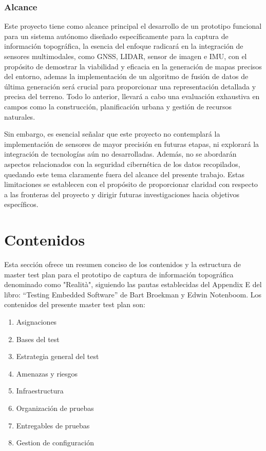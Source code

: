 \documentclass[12pt,a4paper, twoside]{article} %
\begin{document}
\subsubsection{Alcance}
\label{subsec:org12e44a2}


Este proyecto tiene como alcance principal el desarrollo de un prototipo funcional para un sistema autónomo diseñado específicamente para la captura de información topográfica, la esencia del enfoque radicará en la integración de sensores multimodales, como GNSS, LIDAR, sensor de imagen e IMU, con el propósito de demostrar la viabilidad y eficacia en la generación de mapas precisos del entorno, ademas la implementación de un algoritmo de fusión de datos de última generación será crucial para proporcionar una representación detallada y precisa del terreno. Todo lo anterior, llevará a cabo una evaluación exhaustiva en campos como la construcción, planificación urbana y gestión de recursos naturales.




Sin embargo, es esencial señalar que este proyecto no contemplará la implementación de sensores de mayor precisión en futuras etapas, ni explorará la integración de tecnologías aún no desarrolladas. Además, no se abordarán aspectos relacionados con la seguridad cibernética de los datos recopilados, quedando este tema claramente fuera del alcance del presente trabajo. Estas limitaciones se establecen con el propósito de proporcionar claridad con respecto a las fronteras del proyecto y dirigir futuras investigaciones hacia objetivos específicos.


\section{Contenidos}
\label{sec:orgc1c4017}

Esta sección ofrece un resumen conciso de los contenidos y la estructura  de master test plan para el prototipo de captura de información topográfica denominado como "Realità", siguiendo las pautas establecidas del Appendix E del libro: “Testing Embedded Software” de Bart Broekman y Edwin Notenboom. Los contenidos del presente master test plan son:


\begin{enumerate}
\item Asignaciones

\item Bases del test

\item Estrategia general del test

\item Amenazas y riesgos

\item Infraestructura

\item Organización de pruebas 

\item Entregables de pruebas 

\item Gestion de configuración

\end{enumerate}
\end{document}
